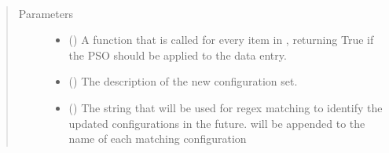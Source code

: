 \documentclass[letterpaper,10pt,english]{sphinxmanual}
\begin{document}
\begin{fulllineitems}
\begin{fulllineitems}
\begin{quote}
\begin{description}
\end{description}\end{quote}

\end{fulllineitems}


\begin{fulllineitems}
\label{\detokenize{dataset:colabfit.tools.dataset.Dataset.define_configuration_set}}~\begin{quote}\begin{description}
\item[{Parameters}] \leavevmode\begin{itemize}
\item {} 
\sphinxAtStartPar
{} () \textendash{} A function that is called for every item in
, returning True if the PSO should be
applied to the data entry.

\item {} 
\sphinxAtStartPar
{} () \textendash{} The description of the new configuration set.

\item {} 
\sphinxAtStartPar
{} () \textendash{} The string that will be used for regex matching to identify
the updated configurations in the future.  will be
appended to the name of each matching configuration

\end{itemize}

\end{description}\end{quote}

\end{fulllineitems}



\end{fulllineitems}
\end{document}
